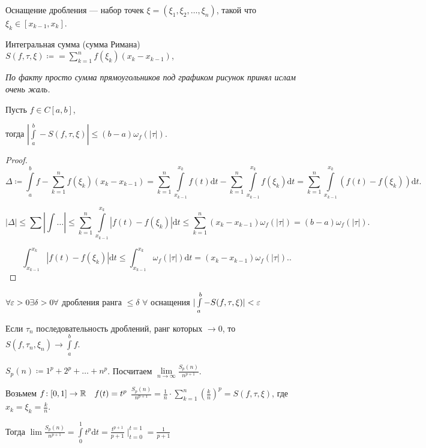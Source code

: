 \begin{definition}
    Оснащение дробления --- набор точек $\xi = ( \xi_1, \xi_2, \ldots, \xi_n)$, такой что $\xi_k \in [x_{k-1}, x_k]$.
\end{definition}
\begin{definition}
    Интегральная сумма (сумма Римана) $S(f, \tau, \xi) \coloneqq = \sum\limits_{k=1}^n f(\xi_k)(x_k - x_{k-1})$, 

    \textit{По факту просто сумма прямоугольников под графиком рисунок принял ислам очень жаль.}
\end{definition}
\begin{theorem}
    Пусть $f \in C[a, b]$,

    тогда  $|\int\limits_a^b - S(f, \tau, \xi)| \le (b-a)\omega_f(|\tau|)$.
\end{theorem}
\begin{proof}
    \[\Delta \coloneqq \int\limits_a^b f - \sum\limits_{k=1}^n f(\xi_k)(x_k - x_{k-1}) = \sum\limits_{k=1}^n \int\limits_{x_{k-1}}^{x_k} f(t)\mathrm{d}t - \sum\limits_{k=1}^n \int\limits_{x_{k-1}}^{x_k}f(\xi_k) \mathrm{d}t = \sum\limits_{k=1}^n \int\limits_{x_{k-1}}^{x_k}(f(t) - f(\xi_k))\mathrm{d}t.\] 

    \[|\Delta| \le \sum |\int \ldots| \le \sum\limits_{k=1}^n \int\limits_{x_{k-1}}^{x_k} |f(t) - f(\xi_k)| \mathrm{d}t \le \sum_{k=1}^n (x_k - x_{k-1})\omega_f(|\tau|) = (b-a)\omega_f(|\tau|).\]

    \[
        \int_{x_{k-1}}^{x_k} |f(t) - f(\xi_k)| \mathrm{d}t \le \int_{x_{k-1}}^{x_k} \omega_f(|\tau|) \mathrm{d}t = (x_k - x_{k-1}) \omega_f(|\tau|).
    .\] 
\end{proof}
\begin{consequence}
    $\forall \varepsilon > 0 \exists \delta > 0 \forall$ дробления ранга  $\le \delta$ $\forall$ оснащения  $|\int\limits_a^b - S(f, \tau, \xi)| < \varepsilon$
\end{consequence}
\begin{consequence}
    Если $\tau_n$ последовательность дроблений, ранг которых  $\to 0$, то $S(f, \tau_n, \xi_n) \to \int\limits_a^b f$.  
\end{consequence}
\begin{example}
    $S_p(n) \coloneqq 1^p + 2^p + \ldots + n^p$. Посчитаем $\lim\limits_{n \to \infty} \frac{S_p(n)}{n^{p+1}}$.

    Возьмем $f\!: [0,1] \to \mathbb{R}\quad f(t) = t^p$
    $\frac{S_p(n)}{n^{p+1}} = \frac{1}{n} \cdot \sum\limits_{k=1}^n \left(\frac{k}{n}\right)^p = S(f, \tau, \xi)$, где $x_k = \xi_k = \frac{k}{n}$.

    Тогда $\lim \frac{S_p(n)}{n^{p+1}} = \int\limits_0^1 t^p \mathrm{d}t = \frac{t^{p+1}}{p+1} \mid_{t=0}^{t=1} = \frac{1}{p+1}$
\end{example}

